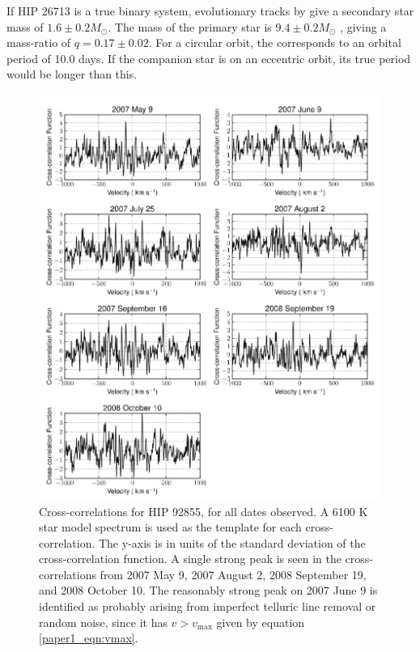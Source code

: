 If HIP 26713 is a true binary system, evolutionary tracks by \cite
{Landin2008} give a secondary star mass of $1.6 \pm 0.2 M_{\odot}$. 
The mass of the primary star is $9.4 \pm 0.2 M_{\odot}$ \citep
{Tetzlaff2010}, giving a mass-ratio of $q = 0.17 \pm 0.02$. For a circular orbit, the corresponds to an orbital period of 10.0 days. If the companion star is on an eccentric orbit, its true period would be longer than this.

\begin{figure}[ht]
  \centering
  \includegraphics[width=5.7in]{Figures/paper1_fig5.pdf}
  \caption{Cross-correlations for HIP 92855, for all dates observed. A 6100 K star model spectrum is used as the template for each cross-correlation. The y-axis is in units of
    the standard deviation of the cross-correlation function. A single strong peak is seen in the
    cross-correlations from 2007 May 9, 2007 August 2, 2008 September
    19, and 2008 October 10. The reasonably strong peak on 2007 June 9 is identified
  as probably arising from imperfect telluric line removal or random noise, since it
  has $v>v_\mathrm{max}$ given by equation \ref{paper1_eqn:vmax}.}
  \label{paper1_fig:hip92855}
\end{figure}




